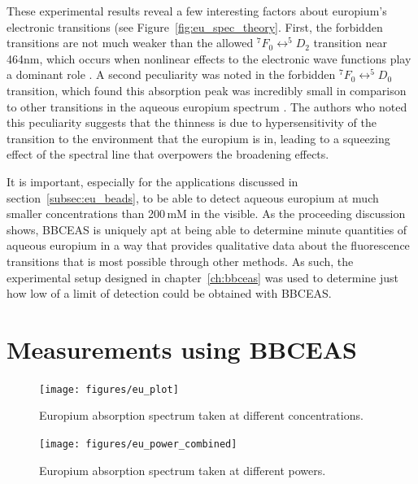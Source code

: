These experimental results reveal a few interesting factors about europium's
electronic transitions (see Figure~\ref{fig:eu_spec_theory}. First, the
forbidden transitions are not much weaker than the allowed $^7F_0
\leftrightarrow ^5D_2$ transition near 464nm, which occurs when nonlinear
effects to the electronic wave functions play a dominant role
\cite{Walsh:2005te}. A second peculiarity was noted in the forbidden $^7F_0
\leftrightarrow ^5D_0$ transition, which found this absorption peak was
incredibly small in comparison to other transitions in the aqueous europium
spectrum \cite{Sawada:1979vca}. The authors who noted this peculiarity suggests
that the thinness is due to hypersensitivity of the transition to the
environment that the europium is in, leading to a squeezing effect of the
spectral line that overpowers the broadening effects.

It is important, especially for the applications discussed in
section~\ref{subsec:eu_beads}, to be able to detect aqueous europium at much
smaller concentrations than 200\,mM in the visible. As the proceeding
discussion shows, \ac{BBCEAS} is uniquely apt at being able to determine minute
quantities of aqueous europium in a way that provides qualitative data about
the fluorescence transitions that is most possible through other methods. As
such, the experimental setup designed in chapter~\ref{ch:bbceas} was used to
determine just how low of a limit of detection could be obtained with
\ac{BBCEAS}.



\section{Measurements using BBCEAS}\label{sec:eu_measurements}

\begin{figure}
\begin{center}
\texttt{[image: figures/eu\_plot]}
\end{center}
\caption{Europium absorption spectrum taken at different concentrations.}
\label{fig:eu_conc}
\end{figure}

\begin{figure}
\begin{center}
\texttt{[image: figures/eu\_power\_combined]}
\end{center}
\caption{Europium absorption spectrum taken at different powers.}
\label{fig:eu_power}
\end{figure}

